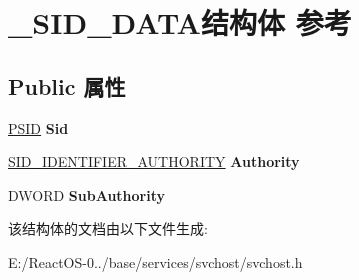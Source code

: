 \hypertarget{struct___s_i_d___d_a_t_a}{}\section{\+\_\+\+S\+I\+D\+\_\+\+D\+A\+T\+A结构体 参考}
\label{struct___s_i_d___d_a_t_a}
\subsection*{Public 属性}
\begin{DoxyCompactItemize}
\item 
\mbox{\label{struct___s_i_d___d_a_t_a_a2bd270d099a0d97c28099ca9a06dc4d2}} 
\hyperlink{struct___s_i_d}{P\+S\+ID} {\bfseries Sid}
\item 
\mbox{\label{struct___s_i_d___d_a_t_a_aebe55fb8f047e2579374fde93c111121}} 
\hyperlink{struct___s_i_d___i_d_e_n_t_i_f_i_e_r___a_u_t_h_o_r_i_t_y}{S\+I\+D\+\_\+\+I\+D\+E\+N\+T\+I\+F\+I\+E\+R\+\_\+\+A\+U\+T\+H\+O\+R\+I\+TY} {\bfseries Authority}
\item 
\mbox{\label{struct___s_i_d___d_a_t_a_a6adf86cc7509df1e2fe282967e616457}} 
D\+W\+O\+RD {\bfseries Sub\+Authority}
\end{DoxyCompactItemize}


该结构体的文档由以下文件生成\+:\begin{DoxyCompactItemize}
\item 
E\+:/\+React\+O\+S-\/0../base/services/svchost/svchost.\+h\end{DoxyCompactItemize}

